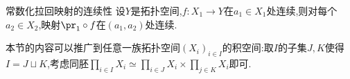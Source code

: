 \begin{proposition}{常数化拉回映射的连续性}{}
	设$Y$是拓扑空间,$f:X_{1}\to Y$在$a_{1}\in X_{1}$处连续,则对每个$a_{2}\in X_{2}$,映射$\pr_{1}\circ f$在$\left(a_{1},a_{2}\right)$处连续.
\end{proposition}

\begin{remark}{}{}
	本节的内容可以推广到任意一族拓扑空间$\left(X_{i}\right)_{i\in I}$的积空间:取$I$的子集$J,K$使得$I=J\sqcup K$,考虑同胚$\prod\limits_{i\in I}X_{i}\simeq\prod\limits_{i\in J}X_{i}\times\prod\limits_{j\in K}X_{i}$即可.
\end{remark}